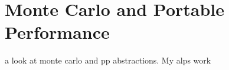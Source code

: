\section{Monte Carlo and Portable Performance}

a look at monte carlo and pp abstractions. My alps work